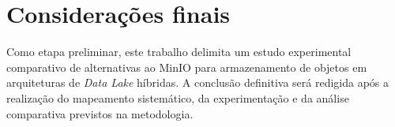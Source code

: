\chapter{Considerações finais}
\label{chp:conclusao}

Como etapa preliminar, este trabalho delimita um estudo experimental comparativo
de alternativas ao MinIO para armazenamento de objetos em arquiteturas de
\textit{Data Lake} híbridas. A conclusão definitiva será redigida após a
realização do mapeamento sistemático, da experimentação e da análise comparativa
previstos na metodologia.
